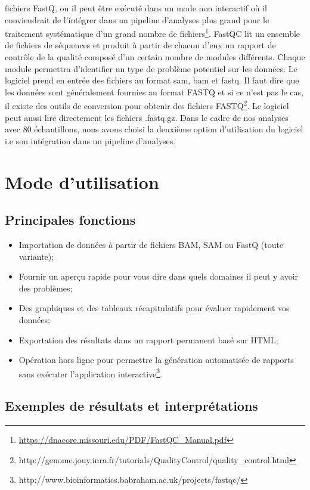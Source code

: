 \documentclass[a4paper,11pt]{article}
\begin{document}
fichiers FastQ, ou il peut être exécuté dans un mode non interactif où
il conviendrait de l’intégrer dans un pipeline d’analyses plus grand
pour le traitement systématique d’un grand nombre de
fichiers\footnote{\url{https://dnacore.missouri.edu/PDF/FastQC_Manual.pdf}}.
FastQC lit un ensemble de fichiers de séquences et produit à partir de
chacun d'eux un rapport de contrôle de la qualité composé d'un certain
nombre de modules différents. Chaque module permettra d'identifier un
type de problème potentiel sur les données. Le logiciel prend en
entrée des fichiers au format sam, bam et fastq. Il faut dire que les
données sont généralement fournies au format FASTQ et si ce n'est pas
le cas, il existe des outils de conversion pour obtenir des fichiers
FASTQ\footnote{{http://genome.jouy.inra.fr/tutorials/QualityControl/quality_control.html}}. Le
logiciel peut aussi lire directement les fichiers .fastq.gz.  Dans le
cadre de nos analyses avec 80 échantillons, nous avons choisi la
deuxième option d'utilisation du logiciel i.e son intégration dans un
pipeline d'analyses.

\section{Mode d'utilisation}

\subsection{Principales fonctions}

\begin{itemize}
  \item Importation de données à partir de fichiers BAM, SAM ou FastQ
    (toute variante);
   \item Fournir un aperçu rapide pour vous dire dans quels domaines
     il peut y avoir des problèmes;
    \item Des graphiques et des tableaux récapitulatifs pour évaluer
      rapidement vos données;
     \item Exportation des résultats dans un rapport permanent basé
       sur HTML;
      \item Opération hors ligne pour permettre la génération
        automatisée de rapports sans exécuter l'application
        interactive\footnote{http://www.bioinformatics.babraham.ac.uk/projects/fastqc/}.
\end{itemize}

\subsection{Exemples de résultats et interprétations}
\end{document}
